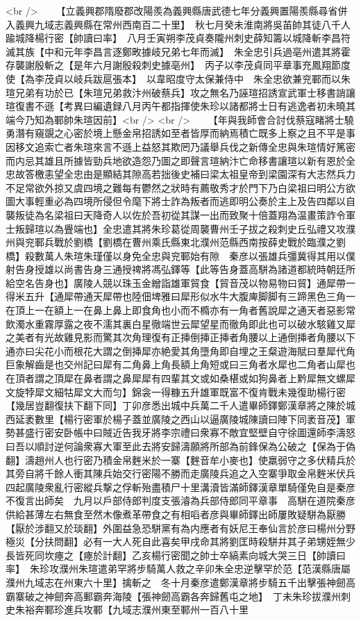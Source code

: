 <br />
　　【立義興郡隋廢郡改陽羨為義興縣唐武德七年分義興置陽羨縣尋省併入義興九域志義興縣在常州西南百二十里】　秋七月癸未淮南將吳苖帥其徒八千人踰城降楊行密【帥讀曰率】　八月壬寅朔李茂貞奏隴州刺史薛知籌以城降斬李昌符滅其族【中和元年李昌言逐鄭畋據岐兄弟七年而滅】　朱全忠引兵過亳州遣其將霍存襲謝殷斬之【是年六月謝殷殺刺史據亳州】　丙子以李茂貞同平章事充鳳翔節度使【為李茂貞以岐兵跋扈張本】　以韋昭度守太保兼侍中　朱全忠欲兼兖鄆而以朱瑄兄弟有功於已【朱瑄兄弟救汴州破蔡兵】攻之無名乃誣瑄招誘宣武軍士移書誚讓瑄復書不遜【考異曰編遺録八月丙午都指揮使朱珍以諸都將士日有逃逸者初未曉其端今乃知為鄆帥朱瑄因前】<br />
<br />
　　【年與我師會合討伐蔡寇睹將士驍勇潛有窺覬之心密於境上懸金帛招誘如至者皆厚而納焉積亡既多上察之且不平是事因移文追索亡者朱瑄來言不遜上益怒其欺罔乃議舉兵伐之新傳全忠與朱瑄情好篤密而内忌其雄且所據皆勁兵地欲造怨乃圖之即聲言瑄納汴亡命移書讓瑄以新有恩於全忠故答檄恚望全忠由是顯結其隙高若拙後史補曰梁太祖皇帝到梁園深有大志然兵力不足常欲外掠又虞四境之難每有鬱然之狀時有薦敬秀才於門下乃白梁祖曰明公方欲圖大事輕重必為四境所侵但令麾下將士詐為叛者而逃即明公奏於主上及告四鄰以自襲叛徒為名梁祖曰天降奇人以佐於吾初從其謀一出而致聚十倍蓋翔為温畫策詐令軍士叛歸瑄以為舋端也】全忠遣其將朱珍葛從周襲曹州壬子拔之殺刺史丘弘禮又攻濮州與兖鄆兵戰於劉橋【劉橋在曹州乘氏縣東北濮州范縣西南按薛史戰於臨濮之劉橋】殺數萬人朱瑄朱瑾僅以身免全忠與兖鄆始有隙　秦彦以張雄兵彊冀得其用以僕射告身授雄以尚書告身三通授禆將馮弘鐸等【此等告身蓋高駢為諸道都統時朝廷所給空名告身也】廣陵人競以珠玉金繒詣雄軍貿食【貿音茂以物易物曰貿】通犀帶一得米五升【通犀帶通天犀帶也陸佃埤雅曰犀形似水牛大腹庳脚脚有三蹄黑色三角一在頂上一在額上一在鼻上鼻上即食角也小而不橢亦有一角者舊說犀之通天者惡影常飲濁水重霧厚露之夜不濡其裏白星徹端世云犀望星而徹角即此也可以破水駭雞又犀之美者有光故雞見影而驚其次角理復有正挿倒挿正挿者角腰以上通倒挿者角腰以下通亦曰尖花小而根花大謂之倒挿犀亦絶愛其角墮角即自埋之王粲遊海賦曰羣犀代角巨象解齒是也交州記曰犀有二角鼻上角長額上角短或曰三角者水犀也二角者山犀也在頂者謂之頂犀在鼻者謂之鼻犀犀有四輩其文或如桑椹或如狗鼻者上黔犀無文螺犀文旋㹀犀文細牯犀文大而匀】錦衾一得糠五升雄軍既富不復肯戰未幾復助楊行密【幾居豈翻復扶下翻下同】丁卯彦悉出城中兵萬二千人遣畢師鐸鄭漢章將之陳於城西延袤數里【楊行密軍於楊子蓋並廣陵之西山以逼廣陵城陳讀曰陣下同袤音茂】軍勢甚盛行密安卧帳中曰賊近告我牙將李宗禮曰衆寡不敵宜堅壁自守徐圖還師李濤怒曰吾以順討逆何論衆寡大軍至此去將安歸濤願將所部為前鋒保為公破之【保為于偽翻】濤趙州人也行密乃積金帛麰米於一寨【麰音牟小麥也】使羸弱守之多伏精兵於其旁自將千餘人衝其陳兵始交行密陽不勝而走廣陵兵追之入空寨爭取金帛麰米伏兵四起廣陵衆亂行密縱兵撃之俘斬殆盡積尸十里溝瀆皆滿師鐸漢章單騎僅免自是秦彦不復言出師矣　九月以戶部侍郎判度支張濬為兵部侍郎同平章事　高駢在道院秦彦供給甚薄左右無食至然木像煮革帶食之有相㗖者彦與畢師鐸出師屢敗疑駢為厭勝【厭於涉翻又於琰翻】外圍益急恐駢黨有為内應者有妖尼王奉仙言於彦曰楊州分野極災【分扶問翻】必有一大人死自此喜矣甲戌命其將劉匡時殺駢并其子弟甥姪無少長皆死同坎瘞之【瘞於計翻】乙亥楊行密聞之帥士卒縞素向城大哭三日【帥讀曰率】　朱珍攻濮州朱瑄遣弟罕將步騎萬人救之辛卯朱全忠逆擊罕於范【范漢縣唐屬濮州九域志在州東六十里】擒斬之　冬十月秦彦遣鄭漢章將步騎五千出擊張神劒高霸寨破之神劒奔高郵霸奔海陵【張神劒高霸各奔歸舊屯之地】　丁未朱珍拔濮州刺史朱裕奔鄆珍進兵攻鄆【九域志濮州東至鄆州一百八十里